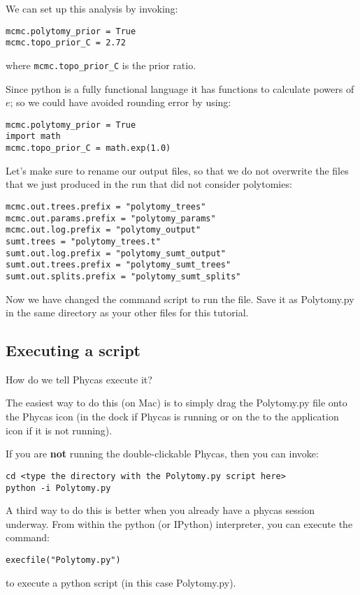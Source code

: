 \documentclass{article}
\newcommand{\cmd}[1]{\texttt{#1}\xspace}
\newcommand{\phycas}{Phycas\xspace}
\newcommand{\localfile}[1]{\textsf{#1}\xspace}
\begin{document}
We can set up this analysis by invoking:

\begin{verbatim}
mcmc.polytomy_prior = True
mcmc.topo_prior_C = 2.72
\end{verbatim}
where \cmd{mcmc.topo\_prior\_C} is the prior ratio.

Since python is a fully functional language it has functions to
calculate powers of $e$; so we could have avoided rounding 
error by using:
\begin{verbatim}
mcmc.polytomy_prior = True
import math
mcmc.topo_prior_C = math.exp(1.0)
\end{verbatim}

Let's make sure to rename our output files, so that we do not overwrite the files that we just produced
in the run that did not consider polytomies:
\begin{verbatim}
mcmc.out.trees.prefix = "polytomy_trees"
mcmc.out.params.prefix = "polytomy_params"
mcmc.out.log.prefix = "polytomy_output"
sumt.trees = "polytomy_trees.t"
sumt.out.log.prefix = "polytomy_sumt_output"
sumt.out.trees.prefix = "polytomy_sumt_trees"
sumt.out.splits.prefix = "polytomy_sumt_splits"
\end{verbatim}

Now we have changed the command script to run the file. Save it as \localfile{Polytomy.py} in the same directory as your other files for this tutorial.

\subsection{Executing a script}
How do we tell \phycas execute it?

The easiest way to do this (on Mac) is to simply drag the \localfile{Polytomy.py} file onto the \phycas icon (in the dock if \phycas is running or on the to the application icon if it is not running).

If you are {\bf not} running the double-clickable \phycas, then you can invoke:
\begin{verbatim}
cd <type the directory with the Polytomy.py script here>
python -i Polytomy.py
\end{verbatim}

A third way to do this is better when you already have a phycas session underway. 
From within the python (or IPython) interpreter, you can execute the command:
\begin{verbatim}
execfile("Polytomy.py")
\end{verbatim}
to execute a python script (in this case  \localfile{Polytomy.py}).
\end{document}
